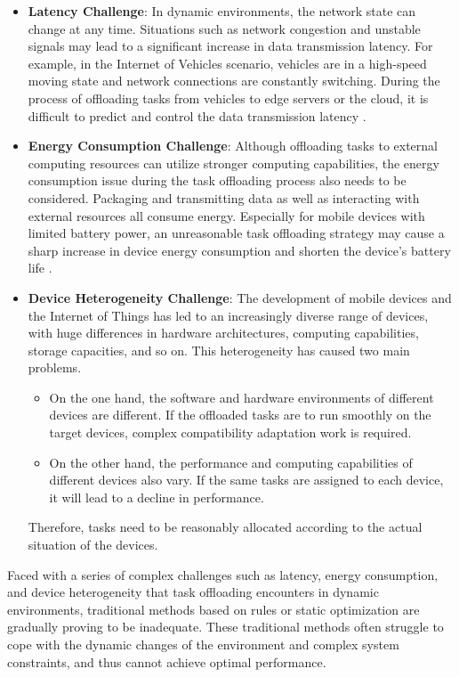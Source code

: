 \documentclass[journal]{IEEEtran}
\begin{document}
\begin{itemize}
    \item \textbf{Latency Challenge}: In dynamic environments, the network state can change at any time. Situations such as network congestion and unstable signals may lead to a significant increase in data transmission latency. For example, in the Internet of Vehicles scenario, vehicles are in a high-speed moving state and network connections are constantly switching. During the process of offloading tasks from vehicles to edge servers or the cloud, it is difficult to predict and control the data transmission latency \cite{zheng02}.

    \item \textbf{Energy Consumption Challenge}: Although offloading tasks to external computing resources can utilize stronger computing capabilities, the energy consumption issue during the task offloading process also needs to be considered. Packaging and transmitting data as well as interacting with external resources all consume energy. Especially for mobile devices with limited battery power, an unreasonable task offloading strategy may cause a sharp increase in device energy consumption and shorten the device's battery life \cite{zheng04}.

    \item \textbf{Device Heterogeneity Challenge}: The development of mobile devices and the Internet of Things has led to an increasingly diverse range of devices, with huge differences in hardware architectures, computing capabilities, storage capacities, and so on. This heterogeneity has caused two main problems. 
    \begin{itemize}
        \item On the one hand, the software and hardware environments of different devices are different. If the offloaded tasks are to run smoothly on the target devices, complex compatibility adaptation work is required.
        \item On the other hand, the performance and computing capabilities of different devices also vary. If the same tasks are assigned to each device, it will lead to a decline in performance.
    \end{itemize}
    Therefore, tasks need to be reasonably allocated according to the actual situation of the devices.
\end{itemize}

Faced with a series of complex challenges such as latency, energy consumption, and device heterogeneity that task offloading encounters in dynamic environments, 
traditional methods based on rules or static optimization are gradually proving to be inadequate. These traditional methods often struggle to cope with the dynamic changes of the environment and complex system constraints, and thus cannot achieve optimal performance.
\end{document}
